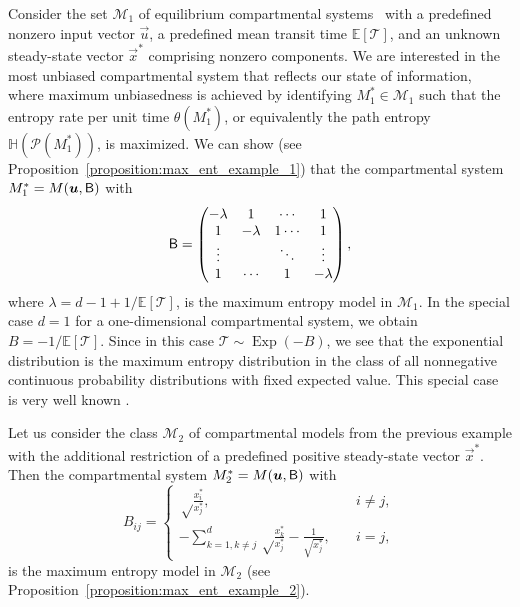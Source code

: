 \documentclass[smallextended]{svjour3}
\makeatletter
\renewcommand*{\eqref}[1]{%
  \hyperref[{#1}]{\textup{\tagform@{\ref*{#1}}}}%
}
\newcommand{\E}{\mathbb{E}}
\newcommand{\TT}{\mathcal{T}}
\renewcommand{\H}{\mathbb{H}}
\newcommand{\Exp}{\operatorname{Exp}}
\newcommand{\suml}{\sum\limits}
\makeatother
\begin{document}
\begin{example}
\label{max_ent_example_1}
Consider the set $\mathcal{M}_1$ of equilibrium compartmental systems~\eqref{eqn:lin_CS_sys} with a predefined nonzero input vector $\vec{u}$, a predefined mean transit time $\E\left[\TT\right]$, and an unknown steady-state vector $\vec{x}^\ast$ comprising nonzero components.
We are interested in the most unbiased compartmental system that reflects our state of information, where maximum unbiasedness is achieved by identifying $M^\ast_1\in\mathcal{M}_1$ such that the entropy rate per unit time $\theta(M^\ast_1)$, or equivalently the path entropy $\H(\mathcal{P}(M^\ast_1))$, is maximized. 
We can show (see Proposition~\ref{proposition:max_ent_example_1}) that the compartmental system $M^\ast_1=M(\vec{u},\tens{B})$ with 
\begin{equation*}
	\mathsf{B} = \begin{pmatrix}
    -\lambda & 1 & \cdots & 1\\
		1 & -\lambda & 1 \cdots & 1 \\
		\vdots & & \ddots & \vdots\\
		1 & \cdots & 1 & -\lambda
  \end{pmatrix},
\end{equation*}
where $\lambda=d-1+1/\E\left[\TT\right]$, 		
is the maximum entropy model in $\mathcal{M}_1$.
In the special case $d=1$ for a one-dimensional compartmental system, we obtain $B=-1/\E\left[\TT\right]$.
Since in this case $\TT\sim\Exp(-B)$, we see that the exponential distribution is the maximum entropy distribution in the class of all nonnegative continuous probability distributions with fixed expected value.
This special case is very well known \citep[Example~12.2.5]{Cover2006}.
\end{example}

\begin{example}
\label{max_ent_example_2}
Let us consider the class $\mathcal{M}_2$ of compartmental models from the previous example with the additional restriction of a predefined positive steady-state vector $\vec{x}^\ast$.
Then the compartmental system $M^\ast_2=M(\vec{u},\tens{B})$ with
\begin{equation*}
	B_{ij} = \begin{cases}
    \sqrt\frac{x_i^\ast}{x_j^\ast},\quad & i\neq j,\\
		-\suml_{k=1,k\neq j}^d \sqrt\frac{x_k^\ast}{x_j^\ast} - \frac{1}{\sqrt{x_j^\ast}}, \quad &i=j,
		\end{cases}
  \end{equation*}
is the maximum entropy model in $\mathcal{M}_2$ (see Proposition~\ref{proposition:max_ent_example_2}).
\end{example}
\end{document}
